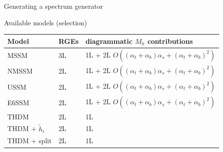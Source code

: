 \documentclass[hyperref={pdfpagelabels=false},ngerman]{beamer}
\newcommand{\Lagr}{\mathcal{L}}
\renewcommand{\emph}{\textbf}
\begin{document}
\begin{frame}{Generating a spectrum generator}
  \begin{figure}
    \centering
  \end{figure}
\end{frame}


\begin{frame}{Available models (selection)}
  \begin{table}
    \centering
    \begin{tabular}{llll}
      Model             & RGEs & \multicolumn{2}{l}{diagrammatic $M_h$ contributions} \\
      \midrule
      MSSM              & 3L   & \multicolumn{2}{l}{1L + 2L $O((\alpha_t + \alpha_b) \alpha_s + (\alpha_t + \alpha_b)^2)$} \\
      NMSSM             & 2L   & \multicolumn{2}{l}{1L + 2L $O((\alpha_t + \alpha_b) \alpha_s + (\alpha_t + \alpha_b)^2)$} \\
      USSM              & 2L   & \multicolumn{2}{l}{1L + 2L $O((\alpha_t + \alpha_b) \alpha_s + (\alpha_t + \alpha_b)^2)$} \\
      E6SSM             & 2L   & \multicolumn{2}{l}{1L + 2L $O((\alpha_t + \alpha_b) \alpha_s + (\alpha_t + \alpha_b)^2)$} \\
      THDM              & 2L   & 1L \\
      THDM + $\tilde{h}_i$ & 2L   & 1L \\
      THDM + split      & 2L   & 1L \\
    \end{tabular}
  \end{table}
\end{frame}
\end{document}
